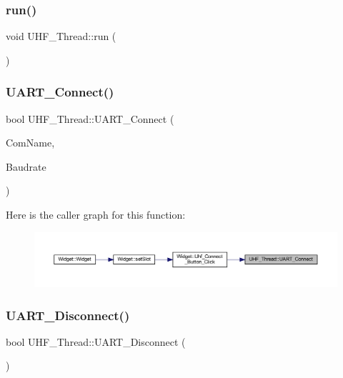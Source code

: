 \subsubsection{\texorpdfstring{run()}{run()}}
{\footnotesize\ttfamily void U\+H\+F\+\_\+\+Thread\+::run (\begin{DoxyParamCaption}{ }\end{DoxyParamCaption})\hspace{0.3cm}{\ttfamily [protected]}}

\mbox{\label{class_u_h_f___thread_a8a872370902a9eb489a836ab28d8044c}} 
\subsubsection{\texorpdfstring{UART\_Connect()}{UART\_Connect()}}
{\footnotesize\ttfamily bool U\+H\+F\+\_\+\+Thread\+::\+U\+A\+R\+T\+\_\+\+Connect (\begin{DoxyParamCaption}\item[{Q\+String}]{Com\+Name,  }\item[{int}]{Baudrate }\end{DoxyParamCaption})}

Here is the caller graph for this function\+:
\nopagebreak
\begin{figure}[H]
\begin{center}
\leavevmode
\includegraphics[width=350pt]{class_u_h_f___thread_a8a872370902a9eb489a836ab28d8044c_icgraph}
\end{center}
\end{figure}
\mbox{\label{class_u_h_f___thread_a4d29770cacd38ec97148b8642df794b8}} 
\subsubsection{\texorpdfstring{UART\_Disconnect()}{UART\_Disconnect()}}
{\footnotesize\ttfamily bool U\+H\+F\+\_\+\+Thread\+::\+U\+A\+R\+T\+\_\+\+Disconnect (\begin{DoxyParamCaption}{ }\end{DoxyParamCaption})}

